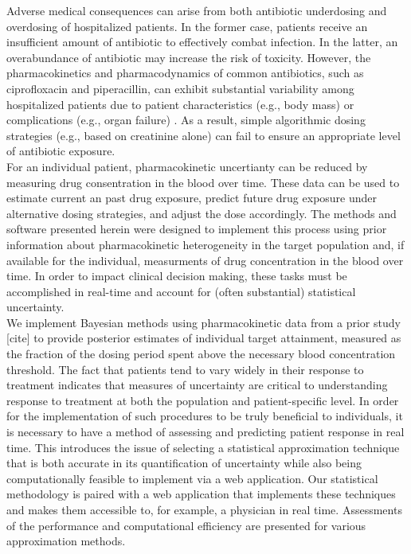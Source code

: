 \documentclass{article}\usepackage[]{graphicx}\usepackage[]{color}
\begin{document}
Adverse medical consequences can arise from both antibiotic underdosing and overdosing of hospitalized patients. In the former case, patients receive an insufficient amount of antibiotic to effectively combat infection. In the latter, an overabundance of antibiotic may increase the risk of toxicity. However, the pharmacokinetics and pharmacodynamics of common antibiotics, such as ciprofloxacin and piperacillin, can exhibit substantial variability among hospitalized patients due to patient characteristics (e.g., body mass) or complications (e.g., organ failure) \cite{Shotwell2015, Shotwell2016}. As a result, simple algorithmic dosing strategies (e.g., based on creatinine alone) can fail to ensure an appropriate level of antibiotic exposure.\\

For an individual patient, pharmacokinetic uncertianty can be reduced by measuring drug consentration in the blood over time. These data can be used to estimate current an past drug exposure, predict future drug exposure under alternative dosing strategies, and adjust the dose accordingly. The methods and software presented herein were designed to implement this process using prior information about pharmacokinetic heterogeneity in the target population and, if available for the individual, measurments of drug concentration in the blood over time. In order to impact clinical decision making, these tasks must be accomplished in real-time and account for (often substantial) statistical uncertainty.\\

We implement Bayesian methods using pharmacokinetic data from a prior study [cite] to provide posterior estimates of individual  target attainment, measured as the fraction of the dosing period spent above the necessary blood concentration threshold. The fact that patients tend to vary widely in their response to treatment indicates that measures of uncertainty are critical to understanding response to treatment at both the population and patient-specific level. In order for the implementation of such procedures to be truly beneficial to individuals, it is necessary to have a method of assessing and predicting patient response in real time. This introduces the issue of selecting a statistical approximation technique that is both accurate in its quantification of uncertainty while also being computationally feasible to implement via a web application. Our statistical methodology is paired with a web application that implements these techniques and makes them accessible to, for example, a physician in real time. Assessments of the performance and computational efficiency are presented for various approximation methods.
\end{document}
